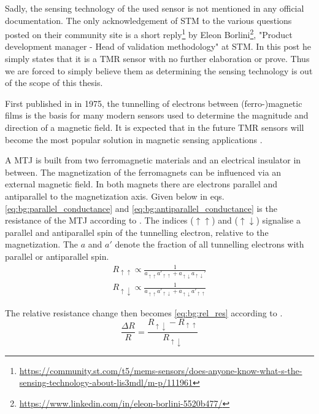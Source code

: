 Sadly, the sensing technology of the used sensor is not mentioned in any official documentation. The only acknowledgement of \ac{STM} to the various questions posted on their community site is a short reply\footnote{\url{https://community.st.com/t5/mems-sensors/does-anyone-know-what-s-the-sensing-technology-about-lis3mdl/m-p/111961}} by Eleon Borlini\footnote{\url{https://www.linkedin.com/in/eleon-borlini-5520b477/}}, "Product development manager - Head of validation methodology" at \ac{STM}. In this post he simply states that it is a \ac{TMR} sensor with no further elaboration or prove. Thus we are forced to simply believe them as determining the sensing technology is out of the scope of this thesis.

First published in \cite{JULLIERE1975} in 1975, the tunnelling of electrons between (ferro-)magnetic films is the basis for many modern sensors used to determine the magnitude and direction of a magnetic field. It is expected that in the future \ac{TMR} sensors will become the most popular solution in magnetic sensing applications \cite{yan2022}.

A \ac{MTJ} is built from two ferromagnetic materials and an electrical insulator in between. The magnetization of the ferromagnets can be influenced via an external magnetic field. In both magnets there are electrons parallel and antiparallel to the magnetization axis. Given below in eqs. \eqref{eq:bg:parallel_conductance} and \eqref{eq:bg:antiparallel_conductance} is the resistance of the \ac{MTJ} according to \cite{JULLIERE1975}. The indices ($\uparrow\uparrow$) and ($\uparrow\downarrow$) signalise a parallel and antiparallel spin of the tunnelling electron, relative to the magnetization. The $a$ and $a'$ denote the fraction of all tunnelling electrons with parallel or antiparallel spin.
\begin{align}
    R_{\uparrow\uparrow}\propto \frac{1}{a^{}_{\uparrow\uparrow}a'_{\uparrow\uparrow}+a^{}_{\uparrow\downarrow}a_{\uparrow\downarrow}'}
    \label{eq:bg:parallel_conductance} \\
     R_{\uparrow\downarrow}\propto \frac{1}{a^{}_{\uparrow\uparrow}a'_{\uparrow\downarrow}+a^{}_{\uparrow\downarrow}a'_{\uparrow\uparrow}}
     \label{eq:bg:antiparallel_conductance}
\end{align}

The relative resistance change then becomes \eqref{eq:bg:rel_res} according to \cite{moodera1995}.
\begin{equation}
    \frac{\Delta R}{R}=\frac{R_{\uparrow\downarrow} - R_{\uparrow\uparrow}}{R_{\uparrow\downarrow}}
    \label{eq:bg:rel_res}
\end{equation}

